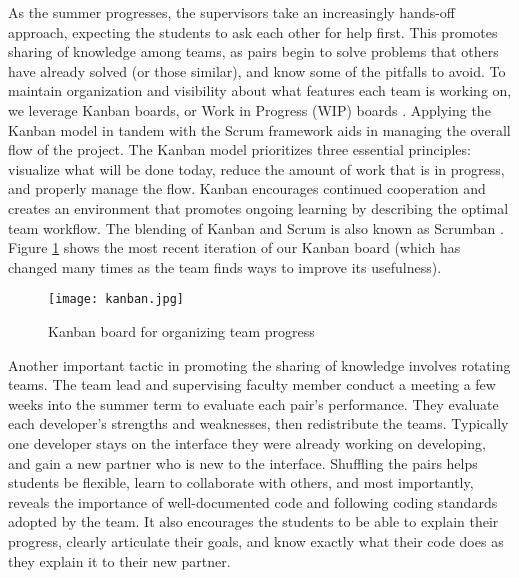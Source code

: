 As the summer progresses, the supervisors take an increasingly hands-off approach, expecting the students to ask each other for help first. This promotes sharing of knowledge among teams, as pairs begin to solve problems that others have already solved (or those similar), and know some of the pitfalls to avoid. To maintain organization and visibility about what features each team is working on, we leverage Kanban boards, or Work in Progress (WIP) boards \cite{anderson2010kanban}. Applying the Kanban model in tandem with the Scrum framework aids in managing the overall flow of the project. The Kanban model prioritizes three essential principles: visualize what will be done today, reduce the amount of work that is in progress, and properly manage the flow. Kanban encourages continued cooperation and creates an environment that promotes ongoing learning by describing the optimal team workflow. The blending of Kanban and Scrum is also known as Scrumban \cite{ladas2009scrumban}. Figure \ref{kanban} shows the most recent iteration of our Kanban board (which has changed many times as the team finds ways to improve its usefulness).
\begin{figure}[h]
 \centering
 \texttt{[image: kanban.jpg]}
 \caption{Kanban board for organizing team progress}
 \label{kanban}
\end{figure}

Another important tactic in promoting the sharing of knowledge involves rotating teams. The team lead and supervising faculty member conduct a meeting a few weeks into the summer term to evaluate each pair's performance. They evaluate each developer's strengths and weaknesses, then redistribute the teams. Typically one developer stays on the interface they were already working on developing, and gain a new partner who is new to the interface. Shuffling the pairs helps students be flexible, learn to collaborate with others, and most importantly, reveals the importance of well-documented code and following coding standards adopted by the team. It also encourages the students to be able to explain their progress, clearly articulate their goals, and know exactly what their code does as they explain it to their new partner.

